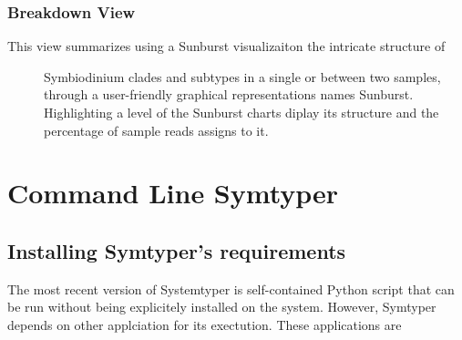 \documentclass[letterpaper,10pt,english]{sphinxmanual}
\begin{document}
\subsection{Breakdown View}
\label{Web:breakdown-view}\begin{figure}[htbp]
\centering

\end{figure}
\begin{description}
\item[{This view summarizes using a Sunburst visualizaiton  the intricate structure of}] \leavevmode
Symbiodinium clades and subtypes in a single or between two samples,
through a user-friendly graphical representations names
Sunburst. Highlighting a level of the Sunburst charts diplay its
structure and the percentage of sample reads assigns to it.

\end{description}


\chapter{Command Line Symtyper}
\label{CommanLine::doc}\label{CommanLine:command-line-symtyper}

\section{Installing Symtyper's requirements}
\label{CommanLine:installing-symtyper-s-requirements}
The most recent version of Systemtyper is self-contained Python script that can be run without being explicitely installed on the system. However, Symtyper depends on other applciation for its exectution. These applications are
\end{document}
